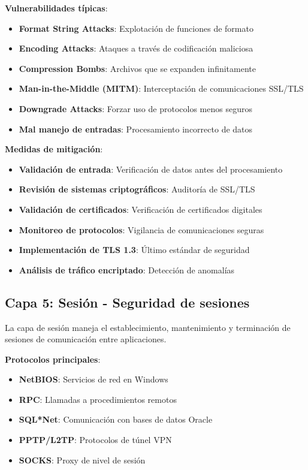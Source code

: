 \textbf{Vulnerabilidades típicas}:
\begin{itemize}
    \item \textbf{Format String Attacks}: Explotación de funciones de formato
    \item \textbf{Encoding Attacks}: Ataques a través de codificación maliciosa
    \item \textbf{Compression Bombs}: Archivos que se expanden infinitamente
    \item \textbf{Man-in-the-Middle (MITM)}: Interceptación de comunicaciones SSL/TLS
    \item \textbf{Downgrade Attacks}: Forzar uso de protocolos menos seguros
    \item \textbf{Mal manejo de entradas}: Procesamiento incorrecto de datos
\end{itemize}

\textbf{Medidas de mitigación}:
\begin{itemize}
    \item \textbf{Validación de entrada}: Verificación de datos antes del procesamiento
    \item \textbf{Revisión de sistemas criptográficos}: Auditoría de SSL/TLS
    \item \textbf{Validación de certificados}: Verificación de certificados digitales
    \item \textbf{Monitoreo de protocolos}: Vigilancia de comunicaciones seguras
    \item \textbf{Implementación de TLS 1.3}: Último estándar de seguridad
    \item \textbf{Análisis de tráfico encriptado}: Detección de anomalías
    \end{itemize}

\subsection{Capa 5: Sesión - Seguridad de sesiones}

La capa de sesión maneja el establecimiento, mantenimiento y terminación de sesiones de comunicación entre aplicaciones.

\textbf{Protocolos principales}:
        \begin{itemize}
    \item \textbf{NetBIOS}: Servicios de red en Windows
    \item \textbf{RPC}: Llamadas a procedimientos remotos
    \item \textbf{SQL*Net}: Comunicación con bases de datos Oracle
    \item \textbf{PPTP/L2TP}: Protocolos de túnel VPN
    \item \textbf{SOCKS}: Proxy de nivel de sesión
        \end{itemize}

